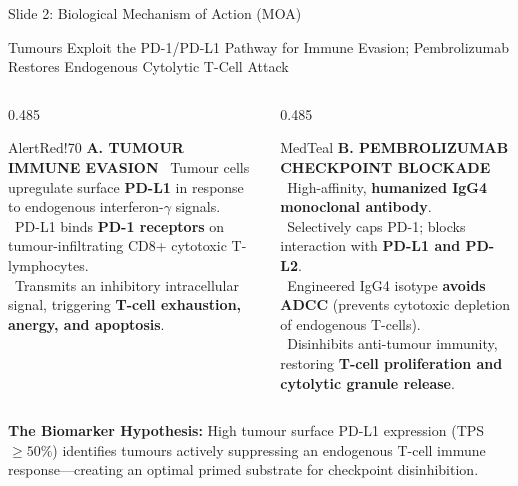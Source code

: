 \documentclass[aspectratio=169,10pt]{beamer}
\begin{document}
\begin{frame}{Slide 2: Biological Mechanism of Action (MOA)}
\begin{actionbanner}
Tumours Exploit the PD-1/PD-L1 Pathway for Immune Evasion; Pembrolizumab Restores Endogenous Cytolytic T-Cell Attack
\end{actionbanner}

\vspace{2pt}

\begin{columns}[T]
  \begin{column}{0.485\textwidth}
    \begin{statcard}{AlertRed!70}
      {\scriptsize\textbf{\color{AlertRed}A. TUMOUR IMMUNE EVASION}}
      \vskip 3pt
      \tiny
      \textbullet\ Tumour cells upregulate surface \textbf{PD-L1} in response to endogenous interferon-$\gamma$ signals.\\[2pt]
      \textbullet\ PD-L1 binds \textbf{PD-1 receptors} on tumour-infiltrating CD8+ cytotoxic T-lymphocytes.\\[2pt]
      \textbullet\ Transmits an inhibitory intracellular signal, triggering \textbf{T-cell exhaustion, anergy, and apoptosis}.
    \end{statcard}
  \end{column}
  
  \begin{column}{0.485\textwidth}
    \begin{statcard}{MedTeal}
      {\scriptsize\textbf{\color{MedTeal}B. PEMBROLIZUMAB CHECKPOINT BLOCKADE}}
      \vskip 3pt
      \tiny
      \textbullet\ High-affinity, \textbf{humanized IgG4 monoclonal antibody}.\\[2pt]
      \textbullet\ Selectively caps PD-1; blocks interaction with \textbf{PD-L1 and PD-L2}.\\[2pt]
      \textbullet\ Engineered IgG4 isotype \textbf{avoids ADCC} (prevents cytotoxic depletion of endogenous T-cells).\\[2pt]
      \textbullet\ Disinhibits anti-tumour immunity, restoring \textbf{T-cell proliferation and cytolytic granule release}.
    \end{statcard}
  \end{column}
\end{columns}

\vspace{3pt}

\begin{calloutcard}
  \scriptsize\textbf{The Biomarker Hypothesis:} High tumour surface PD-L1 expression (TPS $\ge 50\%$) identifies tumours actively suppressing an endogenous T-cell immune response---creating an optimal primed substrate for checkpoint disinhibition.
\end{calloutcard}
\end{frame}
\end{document}
